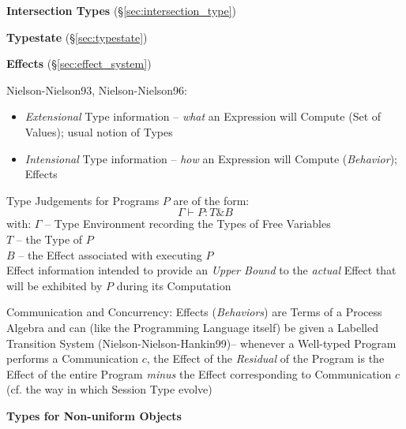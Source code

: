 \textbf{Intersection Types} (\S\ref{sec:intersection_type})

\textbf{Typestate} (\S\ref{sec:typestate})

\textbf{Effects} (\S\ref{sec:effect_system})

Nielson-Nielson93, Nielson-Nielson96:

\begin{itemize}
  \item \emph{Extensional} Type information -- \emph{what} an
    Expression will Compute (Set of Values); usual notion of Types
  \item \emph{Intensional} Type information -- \emph{how} an
    Expression will Compute (\emph{Behavior}); Effects
\end{itemize}

Type Judgements for Programs $P$ are of the form:
\[
  \Gamma \vdash P : T\&B
\]
with:
$\Gamma$ -- Type Environment recording the Types of Free Variables \\
$T$ -- the Type of $P$ \\
$B$ -- the Effect associated with executing $P$ \\

Effect information intended to provide an \emph{Upper Bound} to the
\emph{actual} Effect that will be exhibited by $P$ during its
Computation

Communication and Concurrency: Effects (\emph{Behaviors}) are Terms of
a Process Algebra and can (like the Programming Language itself) be
given a Labelled Transition System (Nielson-Nielson-Hankin99)--
whenever a Well-typed Program performs a Communication $c$, the Effect
of the \emph{Residual} of the Program is the Effect of the entire
Program \emph{minus} the Effect corresponding to Communication $c$
(cf. the way in which Session Type evolve)


\textbf{Types for Non-uniform Objects}

